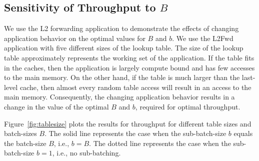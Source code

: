 

\subsection{Sensitivity of Throughput to $B$}
We use the L2 forwarding application to demonstrate the effects of changing application behavior on the optimal
values for $B$ and $b$. We use the L2Fwd application with five different sizes of the lookup table. The size of
the lookup table approximately represents the working set of the application. If the table fits in the caches,
then the application is largely compute bound and has few accesses to the main memory. On the other hand, if the
table is much larger than the last-level cache, then almost every random table access will result in an access to
the main memory. Consequently, the changing application behavior results in a change in the value of the
optimal $B$ and $b$, required for optimal throughput.

Figure~\ref{fig:tablesize} plots the results for throughput for different table sizes and batch-sizes $B$. The solid
line represents the case when the sub-batch-size $b$ equals the batch-size $B$, i.e., $b=B$. The dotted line represents
the case when the sub-batch-size $b=1$, i.e., no sub-batching.

